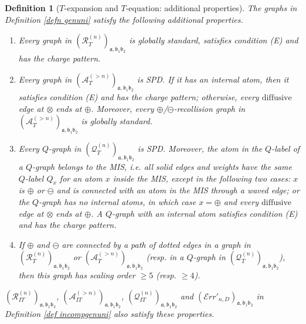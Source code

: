 \documentclass{article}
\newcommand{\1}{\mathds{1}}
\numberwithin{equation}{section}
\newcommand{\fa}{{\mathfrak a}}
\newcommand{\fb}{{\mathfrak b}}
\renewcommand{\geq}{\geqslant}
\renewcommand{\ge}{\geq}
\newcommand{\dashed}{\text{diffusive}}
\theoremstyle{plain} %
\newtheorem{definition}[theorem]{Definition}
\theoremstyle{remark}
\newcommand{\incomp}{{\text{$T$-equation}}}
\newcommand{\PTn}{\mathcal R_T^{(n)}}
\newcommand{\PITn}{{\mathcal R_{IT}^{(n)}}}
\newcommand{\QTn}{\mathcal Q_T^{(n)}}
\newcommand{\QITn}{{\mathcal Q_{IT}^{(n)}}}
\newcommand{\ATn}{\mathcal A_T^{(>n)}}
\newcommand{\AITn}{{\mathcal A_{IT}^{(>n)}}}
\newcommand{\Err}{{\mathcal Err}}
\begin{document}
\begin{definition} [$T$-expansion and $\incomp$: additional properties]\label{def genuni2}
The graphs in Definition \ref{defn genuni} satisfy the following additional properties. 

\begin{enumerate}

\item Every graph in $(\PTn)_{\fa,\fb_1\fb_2}$ is globally standard, satisfies condition (E) and has the charge pattern. %

\item Every graph in $  (\ATn)_{\fa,\fb_1\fb_2} $ is SPD. %
If it has an internal atom, then it satisfies condition (E) and has the charge pattern; otherwise, every $\dashed$ edge at $\otimes$ ends at $\oplus$. Moreover, every $\oplus$/$\ominus$-recollision graph in $(\ATn)_{\fa,\fb_1\fb_2}$ is globally standard.


\item Every $Q$-graph in $(\QTn)_{\fa,\fb_1\fb_2} $ is SPD. %
Moreover, the atom in the $Q$-label of a $Q$-graph belongs to the MIS, i.e. all solid edges and weights have the same $Q$-label $Q_x$ for an atom $x$ inside the MIS, except in the following two cases: $x$ is $\oplus$ or $\ominus$ and is connected with an atom in the MIS through a waved edge; or the $Q$-graph has no internal atoms, in which case $x=\oplus$ and every $\dashed$ edge at $\otimes$ ends at $\oplus$. A $Q$-graph with an internal atom satisfies condition (E) and has the charge pattern.

\item If $\oplus$ and $\ominus$ are connected by a path of dotted edges in a graph in $(\PTn)_{\fa,\fb_1\fb_2}$ or $(\ATn)_{\fa,\fb_1\fb_2}$ (resp. in a $Q$-graph in $(\QTn)_{\fa,\fb_1\fb_2}$), then this graph has scaling order $\ge 5$ (resp. $\ge 4$).

\end{enumerate}
$(\PITn)_{\fa,\fb_1 \fb_2}$, $(\AITn)_{\fa,\fb_1\fb_2}$, $ (\QITn)_{\fa,\fb_1\fb_2}  $ and $(\Err'_{n,D})_{\fa,\fb_1\fb_2}$ in Definition \ref{def incompgenuni} also satisfy these properties.
\end{definition}
\end{document}
